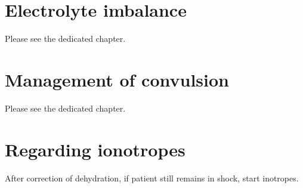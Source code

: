 \documentclass[11pt,a4paper]{report}
\begin{document}
%		



\newpage
\section{Electrolyte imbalance}

Please see the dedicated chapter. 


\section{Management of convulsion}
Please see the dedicated chapter. 



\section{Regarding ionotropes}
After correction of dehydration, if patient still remains in shock, start inotropes. 
\end{document}

